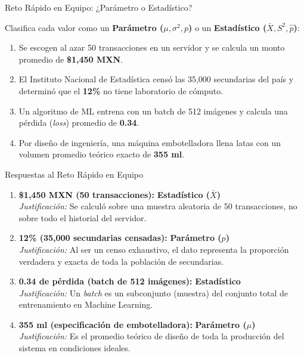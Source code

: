 \begin{frame}{Reto Rápido en Equipo: ¿Parámetro o Estadístico?}
  \begin{retoclase}
    Clasifica cada valor como un \textbf{Parámetro ($\mu, \sigma^2, p$)} o un \textbf{Estadístico ($\bar{X}, S^2, \hat{p}$)}:
  \end{retoclase}
  
  \vspace{0.5em}
  \begin{enumerate}
    \item Se escogen al azar 50 transacciones en un servidor y se calcula un monto promedio de \textbf{\$1,450 MXN}. \pause
    \item El Instituto Nacional de Estadística censó las 35,000 secundarias del país y determinó que el \textbf{12\%} no tiene laboratorio de cómputo. \pause
    \item Un algoritmo de ML entrena con un batch de 512 imágenes y calcula una pérdida (\emph{loss}) promedio de \textbf{0.34}. \pause
    \item Por diseño de ingeniería, una máquina embotelladora llena latas con un volumen promedio teórico exacto de \textbf{355 ml}.
  \end{enumerate}
\end{frame}

\begin{frame}{Respuestas al Reto Rápido en Equipo}
  \begin{enumerate}
    \item \textbf{\$1,450 MXN (50 transacciones):} \color{TecAzulOscuro}\textbf{Estadístico ($\bar{X}$)}\color{black} \pause
       \\ \small \textit{Justificación:} Se calculó sobre una muestra aleatoria de 50 transacciones, no sobre todo el historial del servidor. \pause
    \item \textbf{12\% (35,000 secundarias censadas):} \color{TecRojo}\textbf{Parámetro ($p$)}\color{black} \pause
       \\ \small \textit{Justificación:} Al ser un censo exhaustivo, el dato representa la proporción verdadera y exacta de toda la población de secundarias. \pause
    \item \textbf{0.34 de pérdida (batch de 512 imágenes):} \color{TecAzulOscuro}\textbf{Estadístico}\color{black} \pause
       \\ \small \textit{Justificación:} Un \emph{batch} es un subconjunto (muestra) del conjunto total de entrenamiento en Machine Learning. \pause
    \item \textbf{355 ml (especificación de embotelladora):} \color{TecRojo}\textbf{Parámetro ($\mu$)}\color{black} \pause
       \\ \small \textit{Justificación:} Es el promedio teórico de diseño de toda la producción del sistema en condiciones ideales.
  \end{enumerate}
\end{frame}

